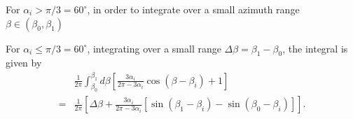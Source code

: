 \documentclass{hitec}
\numberwithin{equation}{section}
\begin{document}
For $\alpha_i > \pi/3 = 60^\circ$, in order to integrate over a small azimuth range $\beta\in(\beta_0, \beta_1)$

For $\alpha_i\le \pi/3 = 60^\circ$, integrating over a small range $\Delta\beta = \beta_1-\beta_0$, the integral is given by
\begin{align}
&\frac{1}{2\pi}\int_{\beta_0}^{\beta_1}d\beta \left[\frac{3\alpha_i}{2\pi-3\alpha_i}\cos(\beta-\beta_i)+1\right]\nonumber\\
=& \frac{1}{2\pi}\left[\Delta\beta + \frac{3\alpha_i}{2\pi-3\alpha_i}\left[\sin(\beta_1-\beta_i) - \sin(\beta_0-\beta_i)\right]\right].
\end{align}
\end{document}
